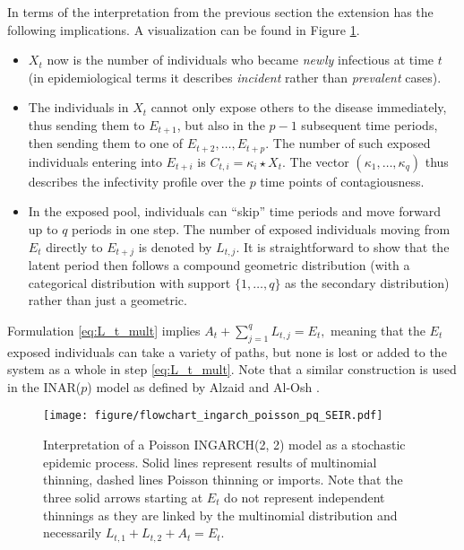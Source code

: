 \documentclass{article}
\begin{document}
In terms of the interpretation from the previous section the extension has the following implications. A visualization can be found in Figure \ref{fig:ingarch_flowchart_poisson_pq}.
\begin{itemize}
\item $X_t$ now is the number of individuals who became \textit{newly} infectious at time $t$ (in epidemiological terms it describes \textit{incident} rather than \textit{prevalent} cases).
\item The individuals in $X_t$ cannot only expose others to the disease immediately, thus sending them to $E_{t + 1}$, but also in the $p - 1$ subsequent time periods, then sending them to one of $E_{t + 2}, \dots, E_{t + p}$. The number of such exposed individuals entering into $E_{t + i}$ is $C_{t, i} = \kappa_i \star X_t$. The vector $(\kappa_1, \dots, \kappa_q)$ thus describes the infectivity profile over the $p$ time points of contagiousness.
\item In the exposed pool, individuals can ``skip'' time periods and move forward up to $q$ periods in one step. The number of exposed individuals moving from $E_t$ directly to $E_{t + j}$ is denoted by $L_{t, j}$. It is straightforward to show that the latent period then follows a compound geometric distribution (with a categorical distribution with support $\{1, \dots, q\}$ as the secondary distribution) rather than just a geometric. %
\end{itemize}
Formulation \eqref{eq:L_t_mult} implies $A_t + \sum_{j = 1}^q L_{t, j} = E_t,$ meaning that the $E_t$ exposed individuals can take a variety of paths, but none is lost or added to the system as a whole in step \eqref{eq:L_t_mult}. Note that a similar construction is used in the INAR($p$) model as defined by Alzaid and Al-Osh \cite{Alzaid1990}.

\begin{figure}[h!]
\center
\texttt{[image: figure/flowchart\_ingarch\_poisson\_pq\_SEIR.pdf]}
\caption{Interpretation of a Poisson INGARCH(2, 2) model as a stochastic epidemic process. Solid lines represent results of multinomial thinning, dashed lines Poisson thinning or imports. Note that the three solid arrows starting at $E_t$ do not represent independent thinnings as they are linked by the multinomial distribution and necessarily $L_{t, 1} + L_{t, 2} + A_t = E_t$.}
\label{fig:ingarch_flowchart_poisson_pq}

\end{figure}
\end{document}
